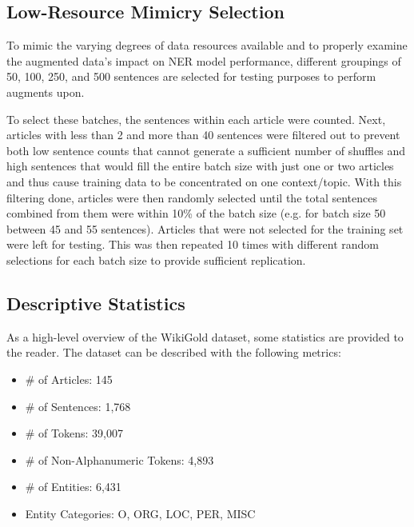 \documentclass[12pt]{report}
\begin{document}
        \subsection{Low-Resource Mimicry Selection}
            To mimic the varying degrees of data resources available and to properly examine the augmented data's impact on NER model performance, different groupings of 50, 100, 250, and 500 sentences are selected for testing purposes to perform augments upon.
            
            To select these batches, the sentences within each article were counted. Next, articles with less than 2 and more than 40 sentences were filtered out to prevent both low sentence counts that cannot generate a sufficient number of shuffles and high sentences that would fill the entire batch size with just one or two articles and thus cause training data to be concentrated on one context/topic. With this filtering done, articles were then randomly selected until the total sentences combined from them were within 10\% of the batch size (e.g. for batch size 50 between 45 and 55 sentences). Articles that were not selected for the training set were left for testing. This was then repeated 10 times with different random selections for each batch size to provide sufficient replication.

        \subsection{Descriptive Statistics}
            
            As a high-level overview of the WikiGold dataset, some statistics are provided to the reader. The dataset can be described with the following metrics:
            
            \begin{itemize}
                \item \# of Articles: 145
                \item \# of Sentences: 1,768
                \item \# of Tokens: 39,007
                \item \# of Non-Alphanumeric Tokens: 4,893
                \item \# of Entities: 6,431
                \item Entity Categories: O, ORG, LOC, PER, MISC
                
            \end{itemize}
            
\end{document}
